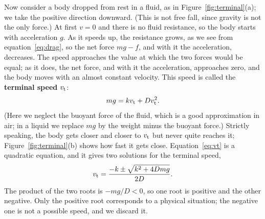 \documentclass[11pt,a4paper]{article}
\begin{document}
Now consider a body dropped from rest in a fluid, as in Figure~\ref{fig:terminal}(a); we take the
positive direction downward. (This is not free fall, since gravity is not the only force.) At first
$v = 0$ and there is no fluid resistance, so the body starts with acceleration $g$. As it speeds up,
the resistance grows, as we see from equation~\eqref{eq:drag}, so the net force $mg - f$, and with it
the acceleration, decreases. The speed approaches the value at which the two forces would be equal;
as it does, the net force, and with it the acceleration, approaches zero, and the body moves with an
almost constant velocity. This speed is called the \textbf{terminal speed} $v_{\mathrm{t}}$:
\begin{equation}\label{eq:vt}
  mg = k v_{\mathrm{t}} + D v_{\mathrm{t}}^2 .
\end{equation}
(Here we neglect the buoyant force of the fluid, which is a good approximation in air; in a liquid we
replace $mg$ by the weight minus the buoyant force.) Strictly speaking, the body gets closer and closer
to $v_{\mathrm{t}}$ but never quite reaches it; Figure~\ref{fig:terminal}(b) shows how fast it gets close.
Equation~\eqref{eq:vt} is a quadratic equation, and it gives two solutions for the terminal speed,
\[
  v_{\mathrm{t}} = \frac{-k \pm \sqrt{k^2 + 4Dmg}}{2D} .
\]
The product of the two roots is $-mg/D < 0$, so one root is positive and the other negative. Only the
positive root corresponds to a physical situation; the negative one is not a possible speed, and we
discard it.
\end{document}
